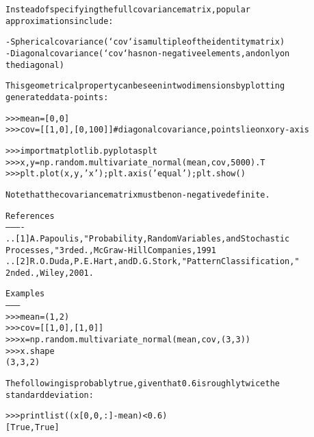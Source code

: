 \begin{boxedminipage}{\funcwidth}
\begin{alltt}
Instead of specifying the full covariance matrix, popular
approximations include:

  - Spherical covariance (`cov` is a multiple of the identity matrix)
  - Diagonal covariance (`cov` has non-negative elements, and only on
    the diagonal)

This geometrical property can be seen in two dimensions by plotting
generated data-points:

{\textgreater}{\textgreater}{\textgreater} mean = [0,0]
{\textgreater}{\textgreater}{\textgreater} cov = [[1,0],[0,100]] \# diagonal covariance, points lie on x or y-axis

{\textgreater}{\textgreater}{\textgreater} import matplotlib.pyplot as plt
{\textgreater}{\textgreater}{\textgreater} x,y = np.random.multivariate\_normal(mean,cov,5000).T
{\textgreater}{\textgreater}{\textgreater} plt.plot(x,y,'x'); plt.axis('equal'); plt.show()

Note that the covariance matrix must be non-negative definite.

References
----------
.. [1] A. Papoulis, "Probability, Random Variables, and Stochastic
       Processes," 3rd ed., McGraw-Hill Companies, 1991
.. [2] R.O. Duda, P.E. Hart, and D.G. Stork, "Pattern Classification,"
       2nd ed., Wiley, 2001.

Examples
--------
{\textgreater}{\textgreater}{\textgreater} mean = (1,2)
{\textgreater}{\textgreater}{\textgreater} cov = [[1,0],[1,0]]
{\textgreater}{\textgreater}{\textgreater} x = np.random.multivariate\_normal(mean,cov,(3,3))
{\textgreater}{\textgreater}{\textgreater} x.shape
(3, 3, 2)

The following is probably true, given that 0.6 is roughly twice the
standard deviation:

{\textgreater}{\textgreater}{\textgreater} print list( (x[0,0,:] - mean) {\textless} 0.6 )
[True, True]
\end{alltt}

\setlength{\parskip}{1ex}
    \end{boxedminipage}

    \label{trunk:qstkutil:bollinger:negative_binomial}

    \vspace{0.5ex}

